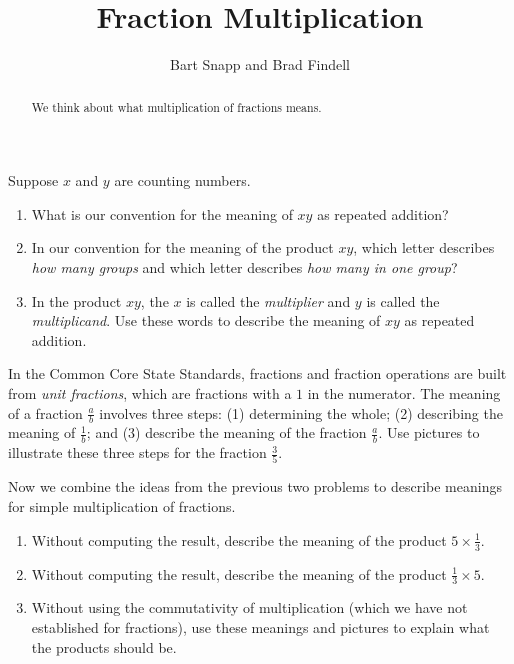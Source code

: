 \documentclass[nooutcomes]{ximera}
\title{Fraction Multiplication}
\author{Bart Snapp and Brad Findell}
\begin{document}
\begin{abstract}
  We think about what multiplication of fractions means.
\end{abstract}
\maketitle

\label{A:fractionMultiplication}

\begin{problem}
Suppose $x$ and $y$ are counting numbers.  
\begin{enumerate}
\item What is our convention for the meaning of $xy$ as repeated addition?  
\item In our convention for the meaning of the product $xy$, which letter describes 
\emph{how many groups} and which letter describes \emph{how many in one group}? 
\item In the product $xy$, the $x$ is called the \emph{multiplier} and $y$ is called the \emph{multiplicand}.  
Use these words to describe the meaning of $xy$ as repeated addition. 
\end{enumerate}
\end{problem}

\vspace{1in}

\begin{problem}
In the Common Core State Standards, fractions and fraction operations are built from \emph{unit fractions}, which are fractions with a $1$ in the numerator.  The meaning of a fraction $\frac{a}{b}$ involves three steps: (1) determining the whole; (2) describing the meaning of $\frac{1}{b}$; and (3) describe the meaning of the fraction $\frac{a}{b}$.  Use pictures to illustrate these three steps for the fraction
$\frac{3}{5}$.  
\end{problem}

\vspace{1in}

\begin{problem}
Now we combine the ideas from the previous two problems to describe meanings for simple multiplication of fractions.  
\begin{enumerate}
\item Without computing the result, describe the meaning of the product $5 \times \frac{1}{3}$.
\item Without computing the result, describe the meaning of the product $\frac{1}{3}\times 5$.
\item Without using the commutativity of multiplication (which we have not established for fractions), 
use these meanings and pictures to explain what the products should be. 
\end{enumerate}
\end{problem}
\end{document}
